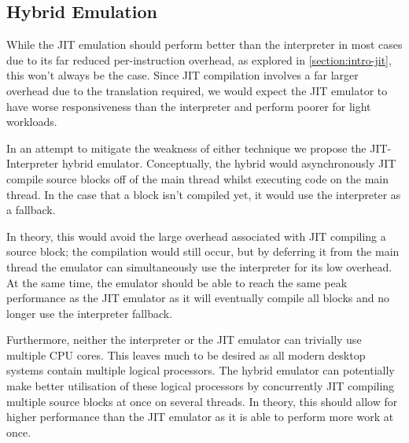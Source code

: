\subsection{Hybrid Emulation}
\label{section:intro-hybrid}

While the JIT emulation should perform better than the interpreter in most cases due to its far reduced per-instruction overhead, as explored in \autoref{section:intro-jit}, this won't always be the case. Since JIT compilation involves a far larger overhead due to the translation required, we would expect the JIT emulator to have worse responsiveness than the interpreter and perform poorer for light workloads.

In an attempt to mitigate the weakness of either technique we propose the JIT-Interpreter hybrid emulator. Conceptually, the hybrid would asynchronously JIT compile source blocks off of the main thread whilst executing code on the main thread. In the case that a block isn't compiled yet, it would use the interpreter as a fallback.

In theory, this would avoid the large overhead associated with JIT compiling a source block; the compilation would still occur, but by deferring it from the main thread the emulator can simultaneously use the interpreter for its low overhead. At the same time, the emulator should be able to reach the same peak performance as the JIT emulator as it will eventually compile all blocks and no longer use the interpreter fallback.

Furthermore, neither the interpreter or the JIT emulator can trivially use multiple CPU cores. This leaves much to be desired as all modern desktop systems contain multiple logical processors. The hybrid emulator can potentially make better utilisation of these logical processors by concurrently JIT compiling multiple source blocks at once on several threads. In theory, this should allow for higher performance than the JIT emulator as it is able to perform more work at once.